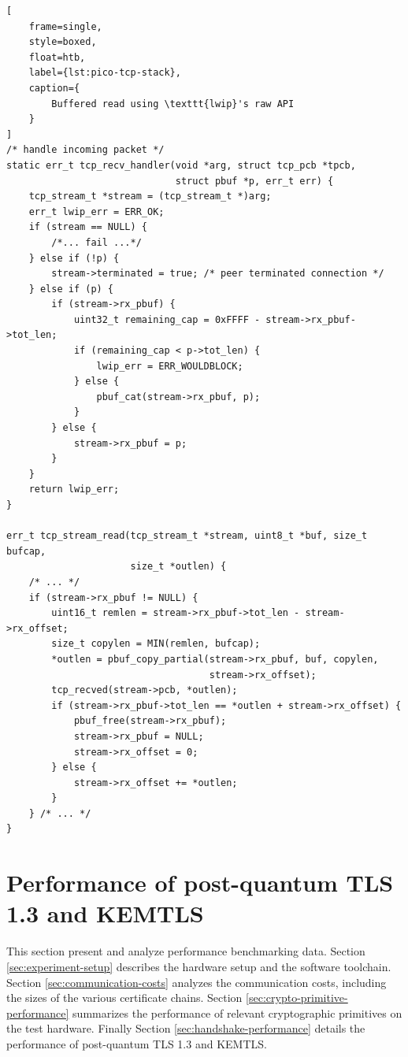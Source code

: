 \documentclass[letterpaper,12pt,titlepage,oneside,final]{book}
\begin{document}
\begin{lstlisting}[
    frame=single, 
    style=boxed, 
    float=htb,
    label={lst:pico-tcp-stack}, 
    caption={
        Buffered read using \texttt{lwip}'s raw API
    }
]
/* handle incoming packet */
static err_t tcp_recv_handler(void *arg, struct tcp_pcb *tpcb, 
                              struct pbuf *p, err_t err) {
    tcp_stream_t *stream = (tcp_stream_t *)arg;
    err_t lwip_err = ERR_OK;
    if (stream == NULL) {
        /*... fail ...*/
    } else if (!p) {
        stream->terminated = true; /* peer terminated connection */
    } else if (p) {
        if (stream->rx_pbuf) {
            uint32_t remaining_cap = 0xFFFF - stream->rx_pbuf->tot_len;
            if (remaining_cap < p->tot_len) {
                lwip_err = ERR_WOULDBLOCK;
            } else {
                pbuf_cat(stream->rx_pbuf, p);
            }
        } else {
            stream->rx_pbuf = p;
        }
    }
    return lwip_err;
}

err_t tcp_stream_read(tcp_stream_t *stream, uint8_t *buf, size_t bufcap,
                      size_t *outlen) {
    /* ... */
    if (stream->rx_pbuf != NULL) {
        uint16_t remlen = stream->rx_pbuf->tot_len - stream->rx_offset;
        size_t copylen = MIN(remlen, bufcap);
        *outlen = pbuf_copy_partial(stream->rx_pbuf, buf, copylen, 
                                    stream->rx_offset);
        tcp_recved(stream->pcb, *outlen);
        if (stream->rx_pbuf->tot_len == *outlen + stream->rx_offset) {
            pbuf_free(stream->rx_pbuf);
            stream->rx_pbuf = NULL;
            stream->rx_offset = 0;
        } else {
            stream->rx_offset += *outlen;
        }
    } /* ... */
}
\end{lstlisting}

\chapter{Performance of post-quantum TLS 1.3 and KEMTLS}\label{sec:performance-of-pqtls-and-kemtls}
This section present and analyze performance benchmarking data. 
Section \ref{sec:experiment-setup} describes the hardware setup and the software toolchain. 
Section \ref{sec:communication-costs} analyzes the communication costs, including the sizes of the various certificate chains. 
Section \ref{sec:crypto-primitive-performance} summarizes the performance of relevant cryptographic primitives on the test hardware. 
Finally Section \ref{sec:handshake-performance} details the performance of post-quantum TLS 1.3 and KEMTLS.
\end{document}

